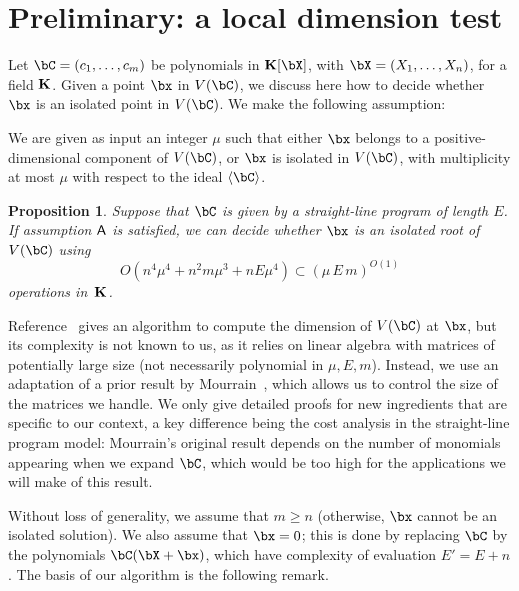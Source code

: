\documentclass[12pt]{article}
\newtheorem{proposition}[definition]{Proposition}
\begin{document}

\section{Preliminary: a local dimension test} \label{sec:isolated}

Let $\bC=(c_1,\dots,c_m)$ be polynomials in $\KK[\bX]$, with
$\bX=(X_1,\dots,X_n)$, for a field $\mathbf{K}$. Given a point $\bx$ in
$V(\bC)$, we discuss here how to decide whether $\bx$ is an isolated
point in $V(\bC)$. We make the following assumption:
\begin{description}[leftmargin=*]
\item [$\assH.$] We are given as input an integer $\mu$ such that
 either $\bx$ belongs to a positive-dimensional component of $V(\bC)$,
 or $\bx$ is isolated in $V(\bC)$, with multiplicity at most $\mu$
  with respect to the ideal $\langle \bC\rangle$.
\end{description}

\begin{proposition}\label{prop:testisolated}
  Suppose that $\bC$ is given by a straight-line program of length $E$.
  If assumption $\mathsf{A}$ is satisfied, we can decide whether $\bx$ is an
  isolated root of $V(\bC)$ using 
$$O(n^4 \mu^4 + n^2 m \mu^3 + n E \mu^4) \subset (\mu\,E\,m)^{O(1)}$$ operations in~$\mathbf{K}$.
\end{proposition}
Reference~\cite{BaHaPeSo09} gives an algorithm to compute the
dimension of $V(\bC)$ at $\bx$, but its complexity is not known to us, as
it relies on linear algebra with matrices of potentially large size
(not necessarily polynomial in $\mu,E,m$).
Instead, we use an adaptation of a prior result by
Mourrain~\cite{Mourrain97}, which allows us to control the size of the
matrices we handle. We only give detailed proofs for new ingredients
that are specific to our context, a key difference being the cost
analysis in the straight-line program model: Mourrain's original
result depends on the number of monomials appearing when we expand
$\bC$, which would be too high for the applications we will make of
this result.

Without loss of generality, we assume that $m\ge n$ (otherwise, $\bx$
cannot be an isolated solution). We also assume that $\bx=0$; this is
done by replacing $\bC$ by the polynomials $\bC(\bX+\bx)$, which have
complexity of evaluation $E'=E+n$.  The basis of our algorithm is the
following remark.
\end{document}
